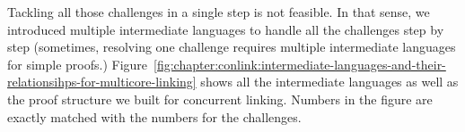 Tackling all those challenges in a single step is not feasible. 
In that sense, we introduced multiple intermediate languages to handle all the challenges step by step (sometimes, resolving one challenge requires multiple intermediate languages for simple proofs.) Figure~\ref{fig:chapter:conlink:intermediate-languages-and-their-relationsihps-for-multicore-linking}  shows all the intermediate languages as well as the proof structure we built for concurrent linking. 
Numbers in the figure are exactly matched with the numbers for the challenges.




%
%
%
%
